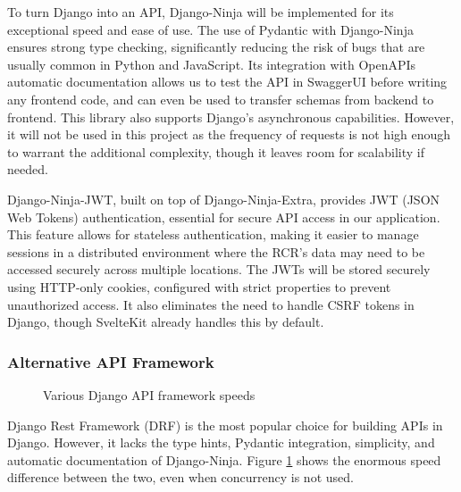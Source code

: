 To turn Django into an API, Django-Ninja will be implemented for its exceptional speed and ease of use. The use of Pydantic with Django-Ninja ensures strong type checking, significantly reducing the risk of bugs that are usually common in Python and JavaScript. Its integration with OpenAPIs automatic documentation allows us to test the API in SwaggerUI before writing any frontend code, and can even be used to transfer schemas from backend to frontend. This library also supports Django's asynchronous capabilities. However, it will not be used in this project as the frequency of requests is not high enough to warrant the additional complexity, though it leaves room for scalability if needed.

Django-Ninja-JWT, built on top of Django-Ninja-Extra, provides JWT (JSON Web Tokens) authentication, essential for secure API access in our application. This feature allows for stateless authentication, making it easier to manage sessions in a distributed environment where the RCR's data may need to be accessed securely across multiple locations. The JWTs will be stored securely using HTTP-only cookies, configured with strict properties to prevent unauthorized access. It also eliminates the need to handle CSRF tokens in Django, though SvelteKit already handles this by default.

\subsubsection{Alternative API Framework}
\begin{figure}[h]
\centering
{}
\vspace{-15pt}
\caption{Various Django API framework speeds}
\vspace{-10pt}
\caption*{\parencite{vitaliy_kucheryaviy_django_2024}
\label{fig:Django-Ninja-speed}}
\vspace{-5pt}
\end{figure}
Django Rest Framework (DRF) is the most popular choice for building APIs in Django. However, it lacks the type hints, Pydantic integration, simplicity, and automatic documentation of Django-Ninja. Figure \ref{fig:Django-Ninja-speed} shows the enormous speed difference between the two, even when concurrency is not used.

